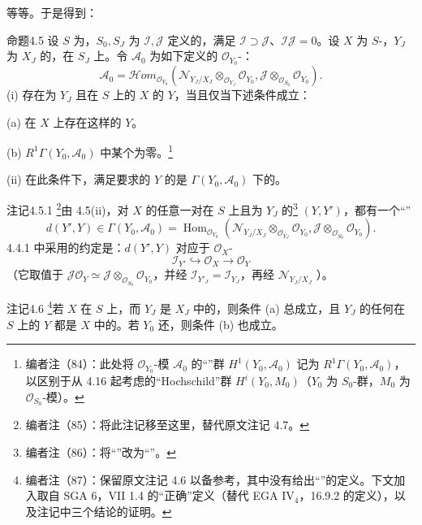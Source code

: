 等等。于是得到：
\begin{SGAresult}{命题}{4.5}
设 $S$ 为，$S_0,S_J$ 为 $\mathscr I,\mathscr J$ 定义的，满足 $\mathscr I\supset\mathscr J$、$\mathscr I\mathscr J=0$。设 $X$ 为 $S$-，$Y_J$ 为 $X_J$ 的，在 $S_J$ 上。令 $\mathscr A_0$ 为如下定义的 $\mathscr O_{Y_0}$-：
\[\mathscr A_0=\mathscr Hom_{\mathscr O_{Y_0}}(\mathscr N_{Y_J/X_J}\otimes_{\mathscr O_{Y_J}}\mathscr O_{Y_0},\mathscr J\otimes_{\mathscr O_{S_0}}\mathscr O_{Y_0}).\]
(i) 存在为 $Y_J$ 且在 $S$ 上的 $X$ 的 $Y$，当且仅当下述条件成立：

(a) 在 $X$ 上存在这样的 $Y$。

(b) $R^1\Gamma(Y_0,\mathscr A_0)$ 中某个为零。\footnote{编者注（84）：此处将 $\mathscr O_{Y_0}$-模 $\mathscr A_0$ 的“”群 $H^1(Y_0,\mathscr A_0)$ 记为 $R^1\Gamma(Y_0,\mathscr A_0)$，以区别于从 4.16 起考虑的“Hochschild”群 $H^i(Y_0,M_0)$（$Y_0$ 为 $S_0$-群，$M_0$ 为 $\mathscr O_{S_0}$-模）。}

(ii) 在此条件下，满足要求的 $Y$ 的是 $\Gamma(Y_0,\mathscr A_0)$ 下的。
\end{SGAresult}
\begin{SGAresult}{注记}{4.5.1}
\footnote{编者注（85）：将此注记移至这里，替代原文注记 4.7。}由 4.5(ii)，对 $X$ 的任意一对在 $S$ 上且为 $Y_J$ 的\footnote{编者注（86）：将“”改为“”。} $(Y,Y')$，都有一个“”
\[d(Y',Y)\in\Gamma(Y_0,\mathscr A_0)=\operatorname{Hom}_{\mathscr O_{Y_0}}(\mathscr N_{Y_J/X_J}\otimes_{\mathscr O_{Y_J}}\mathscr O_{Y_0},\mathscr J\otimes_{\mathscr O_{S_0}}\mathscr O_{Y_0}).\]
4.4.1 中采用的约定是：$d(Y',Y)$ 对应于 $\mathscr O_X$-
\[\mathscr I_{Y'}\hookrightarrow\mathscr O_X\longrightarrow\mathscr O_Y\]
（它取值于 $\mathscr J\mathscr O_Y\simeq\mathscr J\otimes_{\mathscr O_{S_0}}\mathscr O_{Y_0}$，并经 $\mathscr I_{Y'_J}=\mathscr I_{Y_J}$，再经 $\mathscr N_{Y_J/X_J}$ ）。
\end{SGAresult}
\begin{SGAresult}{注记}{4.6}
\footnote{编者注（87）：保留原文注记 4.6 以备参考，其中没有给出“”的定义。下文加入取自 SGA 6，VII 1.4 的“正确”定义（替代 EGA IV$_4$，16.9.2 的定义），以及注记中三个结论的证明。}若 $X$ 在 $S$ 上，而 $Y_J$ 是 $X_J$ 中的，则条件 (a) 总成立，且 $Y_J$ 的任何在 $S$ 上的 $Y$ 都是 $X$ 中的。若 $Y_0$ 还，则条件 (b) 也成立。
\end{SGAresult}
